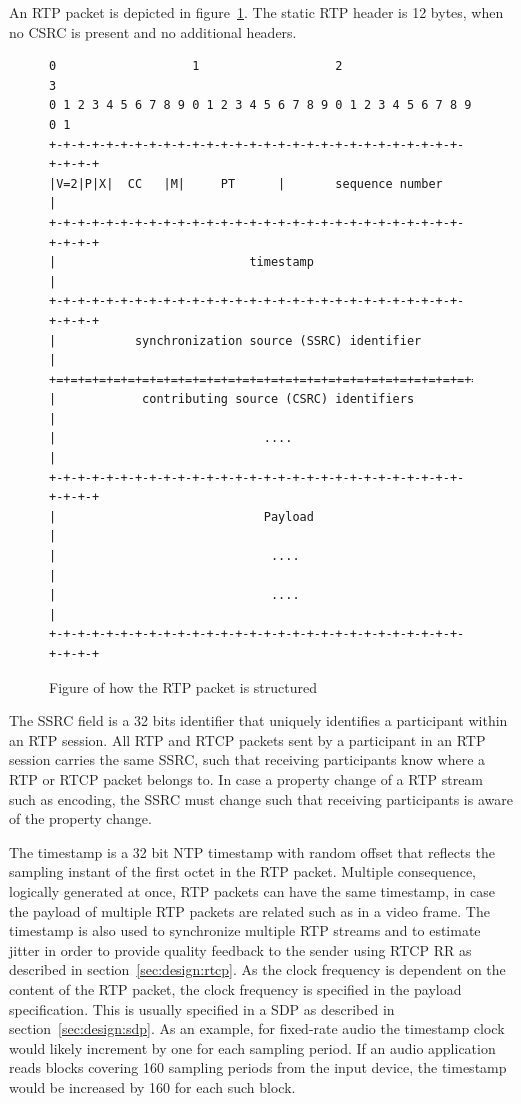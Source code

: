 An RTP packet is depicted in figure~\ref{fig:design:rtppacket}. The static RTP header is 12 bytes, when no CSRC is present and no additional headers.

\begin{figure}[H]
\centering
\begin{verbatim}
0                   1                   2                   3
0 1 2 3 4 5 6 7 8 9 0 1 2 3 4 5 6 7 8 9 0 1 2 3 4 5 6 7 8 9 0 1
+-+-+-+-+-+-+-+-+-+-+-+-+-+-+-+-+-+-+-+-+-+-+-+-+-+-+-+-+-+-+-+-+
|V=2|P|X|  CC   |M|     PT      |       sequence number         |
+-+-+-+-+-+-+-+-+-+-+-+-+-+-+-+-+-+-+-+-+-+-+-+-+-+-+-+-+-+-+-+-+
|                           timestamp                           |
+-+-+-+-+-+-+-+-+-+-+-+-+-+-+-+-+-+-+-+-+-+-+-+-+-+-+-+-+-+-+-+-+
|           synchronization source (SSRC) identifier            |
+=+=+=+=+=+=+=+=+=+=+=+=+=+=+=+=+=+=+=+=+=+=+=+=+=+=+=+=+=+=+=+=+
|            contributing source (CSRC) identifiers             |
|                             ....                              |
+-+-+-+-+-+-+-+-+-+-+-+-+-+-+-+-+-+-+-+-+-+-+-+-+-+-+-+-+-+-+-+-+
|                             Payload                           |
|                              ....                             |
|                              ....                             |
+-+-+-+-+-+-+-+-+-+-+-+-+-+-+-+-+-+-+-+-+-+-+-+-+-+-+-+-+-+-+-+-+
\end{verbatim}
\caption{Figure of how the RTP packet is structured\citep{RFC3550}}
\label{fig:design:rtppacket}
\end{figure}

The \ac{SSRC} field is a 32 bits identifier that uniquely identifies a participant within an RTP session. All RTP and RTCP packets sent by a participant in an RTP session carries the same SSRC, such that receiving participants know where a RTP or RTCP packet belongs to. In case a property change of a RTP stream such as encoding, the SSRC must change such that receiving participants is aware of the property change.

The timestamp is a 32 bit NTP timestamp with random offset that reflects the sampling instant of the first octet in the RTP packet. Multiple consequence, logically generated at once, RTP packets can have the same timestamp, in case the payload of multiple RTP packets are related such as in a video frame.
The timestamp is also used to synchronize multiple RTP streams and to estimate jitter in order to provide quality feedback to the sender using RTCP RR as described in section~\ref{sec:design:rtcp}.
As the clock frequency is dependent on the content of the RTP packet, the clock frequency is specified in the payload specification. This is usually specified in a SDP as described in section~\ref{sec:design:sdp}. As an example, for fixed-rate audio the timestamp clock would likely increment by one for each sampling period. If an audio application reads blocks covering 160 sampling periods from the input device, the timestamp would be increased by 160 for each such block\citep{RFC3550}.

